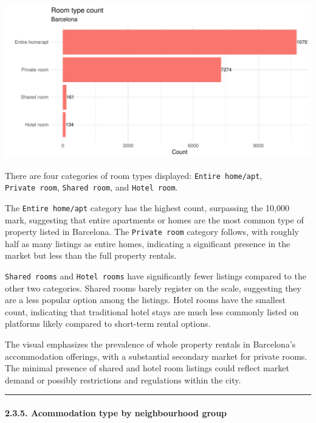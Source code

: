 \documentclass[
]{article}
\begin{document}
\begin{center}\includegraphics{Barcelona-AirBnB-Insights_files/figure-latex/plot4-1} \end{center}

There are four categories of room types displayed:
\texttt{Entire\ home/apt}, \texttt{Private\ room},
\texttt{Shared\ room}, and \texttt{Hotel\ room}.

The \texttt{Entire\ home/apt} category has the highest count, surpassing
the 10,000 mark, suggesting that entire apartments or homes are the most
common type of property listed in Barcelona. The \texttt{Private\ room}
category follows, with roughly half as many listings as entire homes,
indicating a significant presence in the market but less than the full
property rentals.

\texttt{Shared\ rooms} and \texttt{Hotel\ rooms} have significantly
fewer listings compared to the other two categories. Shared rooms barely
register on the scale, suggesting they are a less popular option among
the listings. Hotel rooms have the smallest count, indicating that
traditional hotel stays are much less commonly listed on platforms
likely compared to short-term rental options.

The visual emphasizes the prevalence of whole property rentals in
Barcelona's accommodation offerings, with a substantial secondary market
for private rooms. The minimal presence of shared and hotel room
listings could reflect market demand or possibly restrictions and
regulations within the city.

\begin{center}\rule{0.5\linewidth}{0.5pt}\end{center}

\hypertarget{acommodation-type-by-neighbourhood-group}{%
\paragraph{2.3.5. Acommodation type by neighbourhood
group}\label{acommodation-type-by-neighbourhood-group}}
\end{document}
